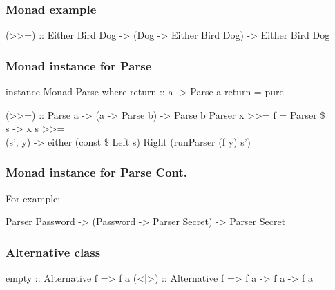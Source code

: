 \documentclass{beamer}
\begin{document}
\begin{frame}
\frametitle{Monad example}
(>>=) :: Either Bird Dog -> (Dog -> Either Bird Dog) -> Either Bird Dog

%
%
%
%
\end{frame}


\begin{frame}
\frametitle{Monad instance for Parse}

instance Monad Parse where
  return :: a -> Parse a
  return = pure

  (>>=) :: Parse a -> (a -> Parse b) -> Parse b
  Parser x >>= f = Parser \$ \\s -> x s >>= \\(s', y) -> either (const \$ Left s) Right (runParser (f y) s')

\end{frame}


\begin{frame}
\frametitle{Monad instance for Parse Cont.}
For example:

Parser Password -> (Password -> Parser Secret) -> Parser Secret

%
%
%
%
\end{frame}


\begin{frame}
\frametitle{Alternative class}
%
%
empty :: Alternative f => f a
(<|>) :: Alternative f => f a -> f a -> f a
%
\end{frame}
\end{document}
